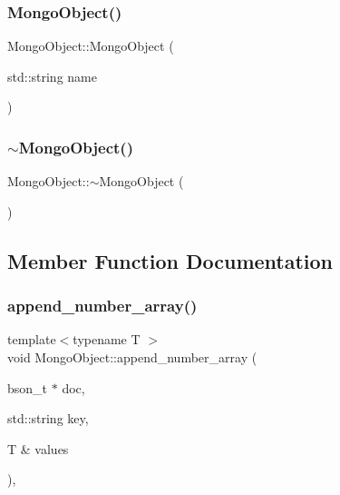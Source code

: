 \mbox{\label{class_mongo_object_a9e876f9d6e7cfcb7d4ce9046014e2b5f}} 
\subsubsection{\texorpdfstring{Mongo\+Object()}{MongoObject()}\hspace{0.1cm}{\footnotesize\ttfamily [2/2]}}
{\footnotesize\ttfamily Mongo\+Object\+::\+Mongo\+Object (\begin{DoxyParamCaption}\item[{std\+::string}]{name }\end{DoxyParamCaption})}

\mbox{\label{class_mongo_object_ac1aba6b5189bca3feb08a698a01c1c30}} 
\subsubsection{\texorpdfstring{$\sim$\+Mongo\+Object()}{~MongoObject()}}
{\footnotesize\ttfamily Mongo\+Object\+::$\sim$\+Mongo\+Object (\begin{DoxyParamCaption}{ }\end{DoxyParamCaption})}



\subsection{Member Function Documentation}
\mbox{\label{class_mongo_object_a56dccd703ae3e3e2193d57d31df12fd0}} 
\subsubsection{\texorpdfstring{append\+\_\+number\+\_\+array()}{append\_number\_array()}}
{\footnotesize\ttfamily template$<$typename T $>$ \\
void Mongo\+Object\+::append\+\_\+number\+\_\+array (\begin{DoxyParamCaption}\item[{bson\+\_\+t $\ast$}]{doc,  }\item[{std\+::string}]{key,  }\item[{T \&}]{values }\end{DoxyParamCaption})\hspace{0.3cm}{\ttfamily [inline]}, {\ttfamily [protected]}}

